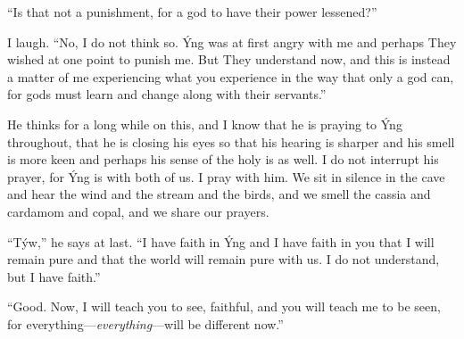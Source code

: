 ``Is that not a punishment, for a god to have their power lessened?''

I laugh. ``No, I do not think so. Ýng was at first angry with me and perhaps They wished at one point to punish me. But They understand now, and this is instead a matter of me experiencing what you experience in the way that only a god can, for gods must learn and change along with their servants.''

He thinks for a long while on this, and I know that he is praying to Ýng throughout, that he is closing his eyes so that his hearing is sharper and his smell is more keen and perhaps his sense of the holy is as well. I do not interrupt his prayer, for Ýng is with both of us. I pray with him. We sit in silence in the cave and hear the wind and the stream and the birds, and we smell the cassia and cardamom and copal, and we share our prayers.

``Týw,'' he says at last. ``I have faith in Ýng and I have faith in you that I will remain pure and that the world will remain pure with us. I do not understand, but I have faith.''

``Good. Now, I will teach you to see, faithful, and you will teach me to be seen, for everything---\emph{everything}---will be different now.''
